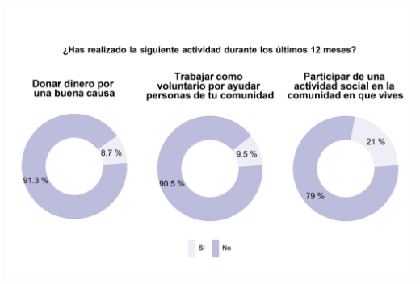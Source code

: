 \documentclass[
  14pt,
]{book}
\begin{document}
\begin{center}\includegraphics[width=52.49in]{images/graph_partcom} \end{center}

  
\end{document}
